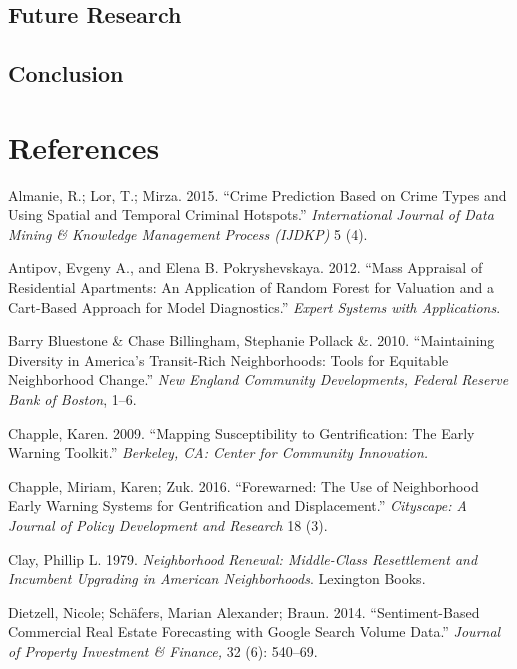 \documentclass[]{article}
\begin{document}
\subsection{Future Research}\label{future-research}

\subsection{Conclusion}\label{conclusion}

\section*{References}\label{references}

\hypertarget{refs}{}
\hypertarget{ref-Almanie2015}{}
Almanie, R.; Lor, T.; Mirza. 2015. ``Crime Prediction Based on Crime
Types and Using Spatial and Temporal Criminal Hotspots.''
\emph{International Journal of Data Mining \& Knowledge Management
Process (IJDKP)} 5 (4).

\hypertarget{ref-antipov12}{}
Antipov, Evgeny A., and Elena B. Pokryshevskaya. 2012. ``Mass Appraisal
of Residential Apartments: An Application of Random Forest for Valuation
and a Cart-Based Approach for Model Diagnostics.'' \emph{Expert Systems
with Applications}.

\hypertarget{ref-Pollack2010}{}
Barry Bluestone \& Chase Billingham, Stephanie Pollack \&. 2010.
``Maintaining Diversity in America's Transit-Rich Neighborhoods: Tools
for Equitable Neighborhood Change.'' \emph{New England Community
Developments, Federal Reserve Bank of Boston}, 1--6.

\hypertarget{ref-Chapple2009}{}
Chapple, Karen. 2009. ``Mapping Susceptibility to Gentrification: The
Early Warning Toolkit.'' \emph{Berkeley, CA: Center for Community
Innovation.}

\hypertarget{ref-Chapple2016}{}
Chapple, Miriam, Karen; Zuk. 2016. ``Forewarned: The Use of Neighborhood
Early Warning Systems for Gentrification and Displacement.''
\emph{Cityscape: A Journal of Policy Development and Research} 18 (3).

\hypertarget{ref-Clay1979}{}
Clay, Phillip L. 1979. \emph{Neighborhood Renewal: Middle-Class
Resettlement and Incumbent Upgrading in American Neighborhoods}.
Lexington Books.

\hypertarget{ref-Dietzell2014}{}
Dietzell, Nicole; Schäfers, Marian Alexander; Braun. 2014.
``Sentiment-Based Commercial Real Estate Forecasting with Google Search
Volume Data.'' \emph{Journal of Property Investment \& Finance,} 32 (6):
540--69.
\end{document}
